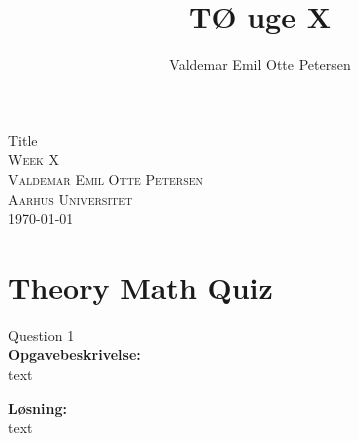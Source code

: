 \documentclass{article}
\author{Valdemar Emil Otte Petersen}
\title{TØ uge X}
\begin{document}
\begingroup

\centering 
{\LARGE Title}\\ %
\vspace*{1\baselineskip}
\scshape
Week X\\
Valdemar Emil Otte Petersen\\ %
{\small Aarhus Universitet}\\ 
{\small \today}

\endgroup

\section{Theory Math Quiz}
{\LARGE Question 1}\\

\textbf{Opgavebeskrivelse:}\\
text

\textbf{Løsning:}\\
text
\end{document}
